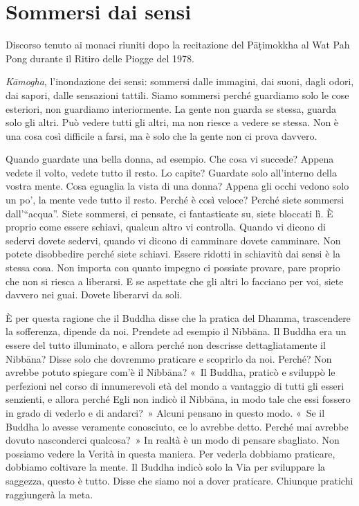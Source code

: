 \chapter{Sommersi dai sensi}

\begin{openingQuote}
  \centering

  Discorso tenuto ai monaci riuniti dopo la recitazione del Pāṭimokkha al
  Wat Pah Pong durante il Ritiro delle Piogge del 1978.
\end{openingQuote}

\emph{Kāmogha}, l'inondazione dei sensi: sommersi dalle immagini, dai
suoni, dagli odori, dai sapori, dalle sensazioni tattili. Siamo sommersi
perché guardiamo solo le cose esteriori, non guardiamo interiormente. La
gente non guarda se stessa, guarda solo gli altri. Può vedere tutti gli
altri, ma non riesce a vedere se stessa. Non è una cosa così difficile a
farsi, ma è solo che la gente non ci prova davvero.

Quando guardate una bella donna, ad esempio. Che cosa vi succede? Appena
vedete il volto, vedete tutto il resto. Lo capite? Guardate solo
all'interno della vostra mente. Cosa eguaglia la vista di una donna?
Appena gli occhi vedono solo un po', la mente vede tutto il resto.
Perché è così veloce? Perché siete sommersi dall'``acqua''. Siete
sommersi, ci pensate, ci fantasticate su, siete bloccati lì. È proprio
come essere schiavi, qualcun altro vi controlla. Quando vi dicono di
sedervi dovete sedervi, quando vi dicono di camminare dovete camminare.
Non potete disobbedire perché siete schiavi. Essere ridotti in schiavitù
dai sensi è la stessa cosa. Non importa con quanto impegno ci possiate
provare, pare proprio che non si riesca a liberarsi. E se aspettate che
gli altri lo facciano per voi, siete davvero nei guai. Dovete liberarvi
da soli.

È per questa ragione che il Buddha disse che la pratica del Dhamma,
trascendere la sofferenza, dipende da noi. Prendete ad esempio il
Nibbāna. Il Buddha era un essere del tutto illuminato, e allora
perché non descrisse dettagliatamente il Nibbāna? Disse solo che
dovremmo praticare e scoprirlo da noi. Perché? Non avrebbe potuto
spiegare com'è il Nibbāna? «~Il Buddha, praticò e sviluppò le
perfezioni nel corso di innumerevoli età del mondo a vantaggio di tutti
gli esseri senzienti, e allora perché Egli non indicò il Nibbāna,
in modo tale che essi fossero in grado di vederlo e di andarci?~» Alcuni
pensano in questo modo. «~Se il Buddha lo avesse veramente conosciuto,
ce lo avrebbe detto. Perché mai avrebbe dovuto nasconderci qualcosa?~»
In realtà è un modo di pensare sbagliato. Non possiamo vedere la Verità
in questa maniera. Per vederla dobbiamo praticare, dobbiamo coltivare la
mente. Il Buddha indicò solo la Via per sviluppare la saggezza, questo è
tutto. Disse che siamo noi a dover praticare. Chiunque pratichi
raggiungerà la meta.

